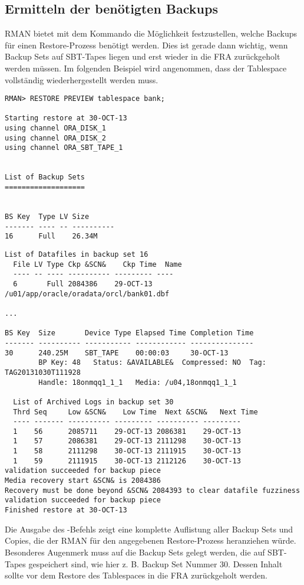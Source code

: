     \subsection{Ermitteln der benötigten Backups}
      RMAN bietet mit dem Kommando  die Möglichkeit festzustellen, welche Backups für einen Restore-Prozess benötigt werden. Dies ist gerade dann wichtig, wenn Backup Sets auf SBT-Tapes liegen und erst wieder in die FRA zurückgeholt werden müssen. Im folgenden Beispiel wird angenommen, dass der Tablespace  vollständig wiederhergestellt werden muss.
      \begin{lstlisting}[caption={Vorschau auf ein Restore},label=admin1439,language=rman]
RMAN> RESTORE PREVIEW tablespace bank;

Starting restore at 30-OCT-13
using channel ORA_DISK_1
using channel ORA_DISK_2
using channel ORA_SBT_TAPE_1


List of Backup Sets
===================


BS Key  Type LV Size
------- ---- -- ----------
16      Full    26.34M
					\end{lstlisting}
\clearpage
					\begin{lstlisting}[language=rman]
  List of Datafiles in backup set 16
  File LV Type Ckp &SCN&    Ckp Time  Name
  ---- -- ---- ---------- --------- ----
  6       Full 2084386    29-OCT-13 /u01/app/oracle/oradata/orcl/bank01.dbf

...

BS Key  Size       Device Type Elapsed Time Completion Time
------- ---------- ----------- ------------ ---------------
30      240.25M    SBT_TAPE    00:00:03     30-OCT-13
        BP Key: 48   Status: &AVAILABLE&  Compressed: NO  Tag: TAG20131030T111928
        Handle: 18onmqq1_1_1   Media: /u04,18onmqq1_1_1

  List of Archived Logs in backup set 30
  Thrd Seq     Low &SCN&    Low Time  Next &SCN&   Next Time
  ---- ------- ---------- --------- ---------- ---------
  1    56      2085711    29-OCT-13 2086381    29-OCT-13
  1    57      2086381    29-OCT-13 2111298    30-OCT-13
  1    58      2111298    30-OCT-13 2111915    30-OCT-13
  1    59      2111915    30-OCT-13 2112126    30-OCT-13
validation succeeded for backup piece
Media recovery start &SCN& is 2084386
Recovery must be done beyond &SCN& 2084393 to clear datafile fuzziness
validation succeeded for backup piece
Finished restore at 30-OCT-13
            \end{lstlisting}
      Die Ausgabe des -Befehls zeigt eine komplette Auflistung aller Backup Sets und Copies, die der RMAN für den angegebenen Restore-Prozess heranziehen würde. Besonderes Augenmerk muss auf die Backup Sets gelegt werden, die auf SBT-Tapes gespeichert sind, wie hier z. B. Backup Set Nummer 30. Dessen Inhalt sollte vor dem Restore des Tablespaces in die FRA zurückgeholt werden.
